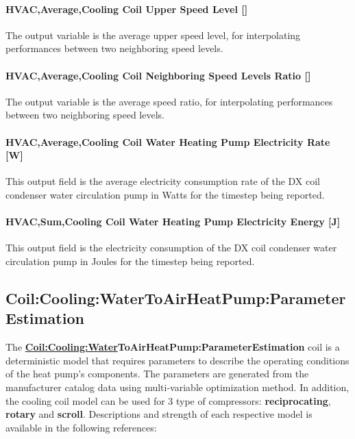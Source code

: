 \paragraph{HVAC,Average,Cooling Coil Upper Speed Level {[}{]}}\label{vshpwhheating-output-cooling-coil-upper-speed-level}
The output variable is the average upper speed level, for interpolating performances between two neighboring speed levels.

\paragraph{HVAC,Average,Cooling Coil Neighboring Speed Levels Ratio {[}{]}}\label{vshpwhheating-output-cooling-coil-neighboring-speed-levels-ratio}
The output variable is the average speed ratio, for interpolating performances between two neighboring speed levels.

\paragraph{HVAC,Average,Cooling Coil Water Heating Pump Electricity Rate {[}W{]}}\label{vshpwhheating-output-cooling-coil-water-heating-pump-electric-power}
This output field is the average electricity consumption rate of the DX coil condenser water circulation pump in Watts for the timestep being reported.

\paragraph{HVAC,Sum,Cooling Coil Water Heating Pump Electricity Energy {[}J{]}}\label{vshpwhheating-output-cooling-coil-water-heating-pump-electric-energy}
This output field is the electricity consumption of the DX coil condenser water circulation pump in Joules for the timestep being reported.



\subsection{Coil:Cooling:WaterToAirHeatPump:ParameterEstimation}\label{coilcoolingwatertoairheatpumpparameterestimation}

The \textbf{\hyperref[coilcoolingwater]{Coil:Cooling:Water}ToAirHeatPump:ParameterEstimation} coil is a deterministic model that requires parameters to describe the operating conditions of the heat pump's components. The parameters are generated from the manufacturer catalog data using multi-variable optimization method. In addition, the cooling coil model can be used for 3 type of compressors: \textbf{reciprocating}, \textbf{rotary} and \textbf{scroll}. Descriptions and strength of each respective model is available in the following references:

